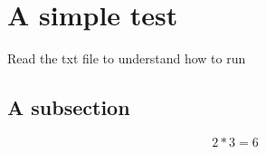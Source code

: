 \documentclass{article}%
\begin{document}
%
\normalsize%
\section{A simple test}%
\label{sec:A simple test}%
Read the txt file to understand how to run %
\subsection{A subsection}%
\label{subsec:A subsection}%
\[%
2*3 = 6%
\]

%
\end{document}
